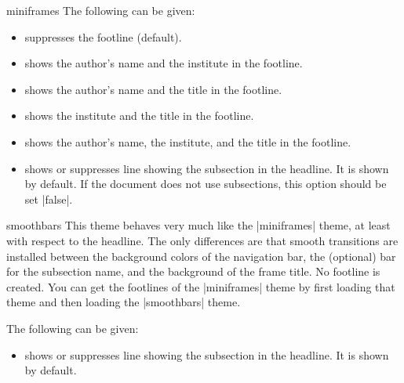 \begin{outerthemeexample}{miniframes}
  The following  can be given:
  \begin{itemize}
  \item {} suppresses the footline (default).
  \item {} shows the author's name and the institute in the footline.
  \item {} shows the author's name and the title in the footline.
  \item {} shows the institute and the title in the footline.
  \item {} shows the author's name, the institute, and the title in the footline.
  \item {} shows or suppresses line showing the subsection in the headline. It is shown by default. If the document does not use subsections, this option should be set |false|.
  \end{itemize}
\end{outerthemeexample}

\begin{outerthemeexample}{smoothbars}
  This theme behaves very much like the |miniframes| theme, at least with respect to the headline. The only differences are that smooth transitions are installed between the background colors of the navigation bar, the (optional) bar for the subsection name, and the background of the frame title. No footline is created. You can get the footlines of the |miniframes| theme by first loading that theme and then loading the |smoothbars| theme.

  The following  can be given:
  \begin{itemize}
  \item {} shows or suppresses line showing the subsection in the headline. It is shown by default.
  \end{itemize}
\end{outerthemeexample}

